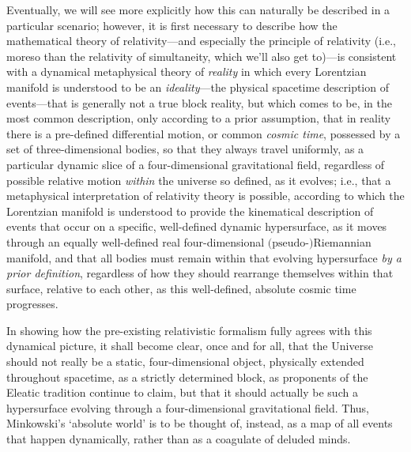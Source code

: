 Eventually, we will see more explicitly how this can naturally be described in a particular scenario; however, it is first necessary to describe how the mathematical theory of relativity---and especially the principle of relativity (i.e., moreso than the relativity of simultaneity, which we'll also get to)---is consistent with a dynamical metaphysical theory of \textit{reality} in which every Lorentzian manifold is understood to be an \textit{ideality}---the physical spacetime description of events---that is generally not a true block reality, but which comes to be, in the most common description, only according to a prior assumption, that in reality there is a pre-defined differential motion, or common \textit{cosmic time}, possessed by a set of three-dimensional bodies, so that they always travel uniformly, as a particular dynamic slice of a four-dimensional gravitational field, regardless of possible relative motion \textit{within} the universe so defined, as it evolves; i.e., that a metaphysical interpretation of relativity theory is possible, according to which the Lorentzian manifold is understood to provide the kinematical description of events that occur on a specific, well-defined dynamic hypersurface, as it moves through an equally well-defined real four-dimensional $\textrm{(pseudo-)}$Riemannian manifold, and that all bodies must remain within that evolving hypersurface \textit{by a prior definition}, regardless of how they should rearrange themselves within that surface, relative to each other, as this well-defined, absolute cosmic time progresses.

In showing how the pre-existing relativistic formalism fully agrees with this dynamical picture, it shall become clear, once and for all, that the Universe should not really be a static, four-dimensional object, physically extended throughout spacetime, as a strictly determined block, as proponents of the Eleatic tradition continue to claim, but that it should actually be such a hypersurface evolving through a four-dimensional gravitational field. Thus, Minkowski's `absolute world' is to be thought of, instead, as a map of all events that happen dynamically, rather than as a coagulate of deluded minds. 

